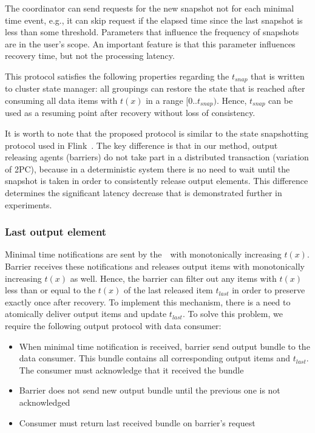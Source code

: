 The coordinator can send requests for the new snapshot not for each minimal time event, e.g., it can skip request if the elapsed time since the last snapshot is less than some threshold. Parameters that influence the frequency of snapshots are in the user's scope. An important feature is that this parameter influences recovery time, but not the processing latency.

This protocol satisfies the following properties regarding the $t_{snap}$ that is written to cluster state manager: all groupings can restore the state that is reached after consuming all data items with $t(x)$ in a range $[0..t_{snap})$. Hence, $t_{snap}$ can be used as a resuming point after recovery without loss of consistency.

It is worth to note that the proposed protocol is similar to the state snapshotting protocol used in Flink~\cite{Carbone:2017:SMA:3137765.3137777}. The key difference is that in our method, output releasing agents (barriers) do not take part in a distributed transaction (variation of 2PC), because in a deterministic system there is no need to wait until the snapshot is taken in order to consistently release output elements. This difference determines the significant latency decrease that is demonstrated further in experiments.

\subsubsection{Last output element}

Minimal time notifications are sent by the~\Acker\ with monotonically increasing $t(x)$. Barrier receives these notifications and releases output items with monotonically increasing $t(x)$ as well. Hence, the barrier can filter out any items with $t(x)$ less than or equal to the $t(x)$ of the last released item $t_{last}$ in order to preserve exactly once after recovery. To implement this mechanism, there is a need to atomically deliver output items and update $t_{last}$. To solve this problem, we require the following output protocol with data consumer: 

\begin{itemize}
    \item When minimal time notification is received, barrier send output bundle to the data consumer. This bundle contains all corresponding output items and $t_{last}$. The consumer must acknowledge that it received the bundle
    \item Barrier does not send new output bundle until the previous one is not acknowledged
    \item Consumer must return last received bundle on barrier's request 
\end{itemize}

